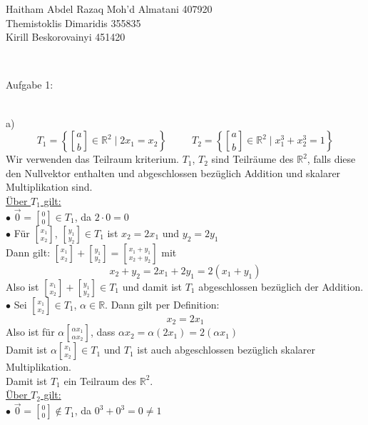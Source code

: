 \documentclass[11pt]{article}
\DeclareRobustCommand{\brkbinom}{\genfrac[]{0pt}{}}
\begin{document}
	\noindent \begin{huge}Haitham Abdel Razaq Moh'd Almatani  407920\\
	
	\noindent Themistoklis Dimaridis 355835\\
	
	
	\noindent Kirill Beskorovainyi 	451420\end{huge}\\\vspace{0.05in}
	
		\noindent \begin{Large}Aufgabe 1:\end{Large}\\[2pt]
			\indent a)\\
				$$T_1= \left\{\brkbinom{a}{b} \in \mathbb{R}^2 \mid 2x_1=x_2 \right\} \hspace{30pt} T_2= \left\{\brkbinom{a}{b} \in \mathbb{R}^2 \mid x_1^3+x_2^3=1 \right\}$$
				Wir verwenden das Teilraum kriterium. $T_1$, $T_2$ sind Teilräume des $\mathbb{R}^2$, falls diese den Nullvektor enthalten und abgeschlossen bezüglich Addition und skalarer Multiplikation sind.\\
				\underline{Über $T_1$ gilt:}\\
				\indent $\bullet$ $\vec{0}=\brkbinom{0}{0} \in T_1$, da $2 \cdot 0 = 0$\\
				\indent $\bullet$ Für $\brkbinom{x_1}{x_2}$, $\brkbinom{y_1}{y_2} \in T_1$ ist $x_2=2x_1$ und $y_2=2y_1$\\ 
				Dann gilt: $\brkbinom{x_1}{x_2}+\brkbinom{y_1}{y_2}=\brkbinom{x_1+y_1}{x_2+y_2}$ mit\\
				$$x_2+y_2=2x_1+2y_1=2(x_1+y_1)$$
				Also ist $\brkbinom{x_1}{x_2}+\brkbinom{y_1}{y_2} \in T_1$ und damit ist $T_1$ abgeschlossen bezüglich der Addition.\\
				\indent $\bullet$ Sei $\brkbinom{x_1}{x_2} \in T_1$, $\alpha \in \mathbb{R}$. Dann gilt per Definition:\\
				$$x_2=2x_1$$
				Also ist für $\alpha \brkbinom{\alpha x_1}{\alpha x_2}$, dass $\alpha x_2=\alpha (2x_1)=2(\alpha x_1)$\\
				Damit ist $\alpha \brkbinom{x_1}{x_2} \in T_1$ und $T_1$ ist auch abgeschlossen bezüglich skalarer Multiplikation.\\
				Damit ist $T_1$ ein Teilraum des $\mathbb{R}^2$.\\
				\underline{Über $T_2$ gilt:}\\
				\indent $\bullet$ $\vec{0}=\brkbinom{0}{0} \notin T_1$, da $0^3+0^3=0 \neq 1$\\
\end{document}
